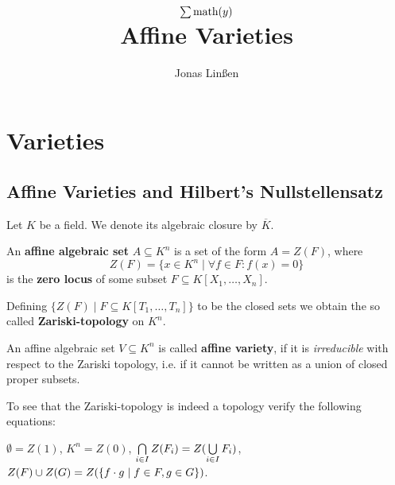 

\title{
	$\sum \text{math}(y)$\\
	Affine Varieties
}
\author{Jonas Linßen}


	\maketitle
	\tableofcontents

	\newpage
	\section{Varieties}
	\subsection{Affine Varieties and Hilbert's Nullstellensatz}

	Let $K$ be a field. We denote its algebraic closure by $\overline{K}$.

	\begin{definition}
		An \textbf{affine algebraic set} $A \subseteq K^n$ is a set of the form $A = Z(F)$, where
		\begin{equation*}
			Z(F) = \{x \in K^n \mid \forall f \in F: f(x) = 0\}
		\end{equation*}
		is the \textbf{zero locus} of some subset $F \subseteq K[X_1, \dots, X_n]$.

		Defining $\{Z(F) \mid F \subseteq K[T_1, \dots, T_n]\}$ to be the closed sets we obtain the so called \textbf{Zariski-topology} on $K^n$.

		An affine algebraic set $V \subseteq K^n$ is called \textbf{affine variety}, if it is \textit{irreducible} with respect to the Zariski topology, i.e. if it cannot be written as a union of closed proper subsets.
	\end{definition}
	\begin{sketch}
		To see that the Zariski-topology is indeed a topology verify  the following equations:

		$\emptyset = Z(1)$, $K^n = Z({0})$, $\bigcap \limits_{i \in I} Z(F_i) = Z(\bigcup \limits_{i \in I} F_i)$, $Z(F) \cup Z(G) = Z(\{f \cdot g \mid f \in F, g \in G\})$.
	\end{sketch}

